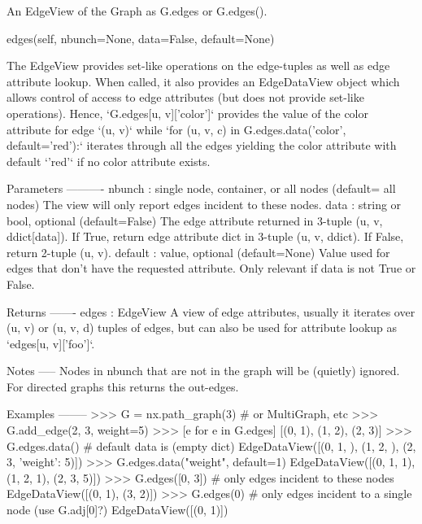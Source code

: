 \begin{DoxyVerb}An EdgeView of the Graph as G.edges or G.edges().

edges(self, nbunch=None, data=False, default=None)

The EdgeView provides set-like operations on the edge-tuples
as well as edge attribute lookup. When called, it also provides
an EdgeDataView object which allows control of access to edge
attributes (but does not provide set-like operations).
Hence, `G.edges[u, v]['color']` provides the value of the color
attribute for edge `(u, v)` while
`for (u, v, c) in G.edges.data('color', default='red'):`
iterates through all the edges yielding the color attribute
with default `'red'` if no color attribute exists.

Parameters
----------
nbunch : single node, container, or all nodes (default= all nodes)
    The view will only report edges incident to these nodes.
data : string or bool, optional (default=False)
    The edge attribute returned in 3-tuple (u, v, ddict[data]).
    If True, return edge attribute dict in 3-tuple (u, v, ddict).
    If False, return 2-tuple (u, v).
default : value, optional (default=None)
    Value used for edges that don't have the requested attribute.
    Only relevant if data is not True or False.

Returns
-------
edges : EdgeView
    A view of edge attributes, usually it iterates over (u, v)
    or (u, v, d) tuples of edges, but can also be used for
    attribute lookup as `edges[u, v]['foo']`.

Notes
-----
Nodes in nbunch that are not in the graph will be (quietly) ignored.
For directed graphs this returns the out-edges.

Examples
--------
>>> G = nx.path_graph(3)  # or MultiGraph, etc
>>> G.add_edge(2, 3, weight=5)
>>> [e for e in G.edges]
[(0, 1), (1, 2), (2, 3)]
>>> G.edges.data()  # default data is {} (empty dict)
EdgeDataView([(0, 1, {}), (1, 2, {}), (2, 3, {'weight': 5})])
>>> G.edges.data("weight", default=1)
EdgeDataView([(0, 1, 1), (1, 2, 1), (2, 3, 5)])
>>> G.edges([0, 3])  # only edges incident to these nodes
EdgeDataView([(0, 1), (3, 2)])
>>> G.edges(0)  # only edges incident to a single node (use G.adj[0]?)
EdgeDataView([(0, 1)])
\end{DoxyVerb}
 \mbox{\label{classnetworkx_1_1classes_1_1graph_1_1Graph_ab2431ffc2332108f4a2724a352205395}} 
